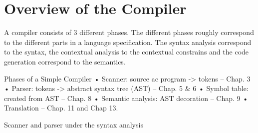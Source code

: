 \section{Overview of the Compiler}


A compiler consists of 3 different phases. The different phases roughly correspond to the different parts in a language specification. The syntax analysis correspond to the syntax, the contextual analysis to the contextual constrains and the code generation correspond to the semantics.


Phases of a Simple Compiler
• Scanner: source ac program -> tokens
– Chap. 3
• Parser: tokens -> abstract syntax tree (AST)
– Chap. 5 & 6
• Symbol table: created from AST
– Chap. 8
• Semantic analysis: AST decoration
– Chap. 9
• Translation
– Chap. 11 and Chap 13.

Scanner and parser under the syntax analysis

